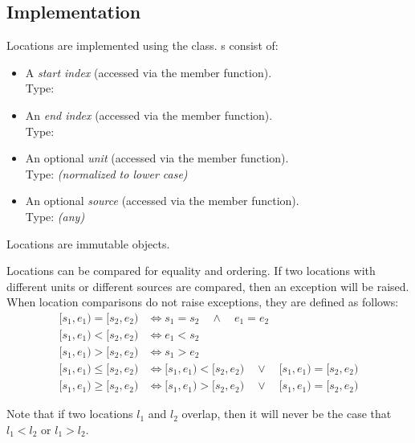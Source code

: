 \documentclass{article}
\begin{document}
  \subsection{Implementation}

  Locations are implemented using the  class.
  s consist of:

  \begin{itemize}

    \item A \emph{start index} (accessed via the  member
    function).  \\Type: 

    \item An \emph{end index} (accessed via the  member
    function).  \\Type: 

    \item An optional \emph{unit} (accessed via the 
    member function).  \\Type:  \emph{(normalized to
    lower case)}

    \item An optional \emph{source} (accessed via the 
    member function).  \\Type: \emph{(any)}

  \end{itemize}

  \noindent
  Locations are immutable objects.

  Locations can be compared for equality and ordering.  If two
  locations with different units or different sources are compared,
  then an exception will be raised.  When location comparisons do not
  raise exceptions, they are defined as follows:
  \begin{align*}
     [s_1,e_1) = [s_2,e_2) &\iff s_1=s_2 \quad \land \quad e_1=e_2 \\
     [s_1,e_1) < [s_2,e_2) &\iff e_1 < s_2 \\
     [s_1,e_1) > [s_2,e_2) &\iff s_1 > e_2 \\
     [s_1,e_1) \leq [s_2,e_2) &\iff [s_1,e_1) < [s_2,e_2) \quad \lor \quad
                             [s_1,e_1) = [s_2,e_2) \\
     [s_1,e_1) \geq [s_2,e_2) &\iff [s_1,e_1) > [s_2,e_2) \quad \lor \quad
                             [s_1,e_1) = [s_2,e_2) 
  \end{align*}

  \noindent
  Note that if two locations $l_1$ and $l_2$ overlap, then it will
  never be the case that $l_1<l_2$ or $l_1>l_2$.
\end{document}
